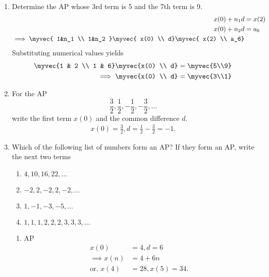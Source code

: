\begin{enumerate}[label=\thesubsection.\arabic*, ref=\thesubsection.\theenumi]
\item Determine the AP whose 3rd term is 5 and the 7th term is 9.
	\\
	\solution
\begin{align}
	x(0)+n_1d &= x(2)
	\\
	x(0)+n_2d &= a_6
	\\
	\implies 
	\myvec{
	1&n_1 
	\\
	1&n_2 
}
	\myvec{
x(0)
\\
	d}
	\myvec{
x(2)
\\
	a_6}
       \end{align}
Substituting numerical values 
yields
\begin{align}
	\myvec{1 & 2 \\ 1 & 6}
	\myvec{x(0) \\ d}
	&=
	\myvec{5\\9}
	\\
	\implies \myvec{x(0) \\ d}
	&=
	\myvec{3\\1}
\end{align}
%
\item For the AP 
$$\frac{3}{2}, \frac{1}{2}, -\frac{1}{2}, -\frac{3}{2}, \dots $$ write the first term $x(0)$ and the common difference $d$.
\\
\solution
\begin{align}
	x(0) = \frac{3}{2}, d=  \frac{1}{2}-\frac{3}{2} = -1.
\end{align}
\item Which of the following list of numbers form an AP? If they form an AP, 
write the next two terms 
		\begin{multicols}{2}
\begin{enumerate}
\item $4, 10, 16, 22, \dots$ 
\item $-2, 2, -2, 2, -2, \dots$
\item $1, -1, -3, -5, \dots$ 
\item $1, 1, 1, 2, 2, 2, 3, 3, 3, \dots$
\end{enumerate}
\end{multicols}
\begin{enumerate}
	\item AP
\begin{align}
	x(0) &= 4, d = 6
	\\
	\implies x(n) &= 4 +6n
	\\
	\text{or, }x(4) &= 28, x(5) = 34.

\end{align}
\end{enumerate}
\end{enumerate}
